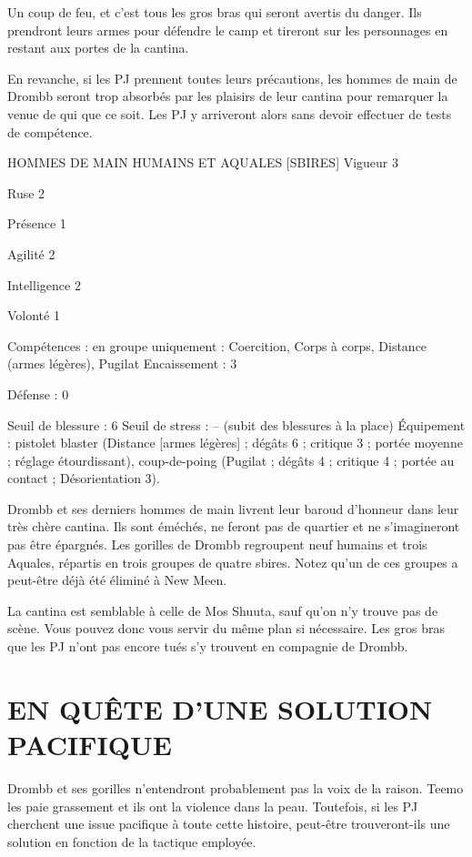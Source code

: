 \documentclass[a4paper,10pt,twoside,twocolumn,openany]{book}
\begin{document}
Un coup de feu, et c’est tous les gros bras qui seront avertis du danger. Ils prendront leurs armes pour défendre le camp et tireront sur les personnages en restant aux portes de la cantina.

En revanche, si les PJ prennent toutes leurs précautions, les hommes de main de Drombb seront trop absorbés par les plaisirs de leur cantina pour remarquer la venue de qui que ce soit. Les PJ y arriveront alors sans
devoir effectuer de tests de compétence.

\begin{monsterbox}
  
HOMMES DE MAIN HUMAINS
ET AQUALES [SBIRES]
Vigueur 3

Ruse 2

Présence 1

Agilité 2

Intelligence 2

Volonté 1

Compétences : en groupe uniquement : Coercition,
Corps à corps, Distance (armes légères), Pugilat
Encaissement : 3

Défense : 0

Seuil de blessure : 6
Seuil de stress : – (subit des blessures à la place)
Équipement : pistolet blaster (Distance [armes légères] ; dégâts 6 ; critique 3 ; portée moyenne ;
réglage étourdissant), coup-de-poing (Pugilat ; dégâts 4 ; critique 4 ; portée au contact ; Désorientation 3).
\end{monsterbox}


\subtitle{COMBAT À LA CANTINA}

Drombb et ses derniers hommes de main livrent leur baroud d’honneur dans leur très chère cantina. Ils sont éméchés, ne feront pas de quartier et ne s’imagineront pas être épargnés. Les gorilles de Drombb regroupent neuf humains et trois Aquales, répartis en trois groupes de quatre sbires. Notez qu’un de ces groupes a peut-être déjà été éliminé à New Meen.

La cantina est semblable à celle de Mos Shuuta, sauf
qu’on n’y trouve pas de scène. Vous pouvez donc vous
servir du même plan si nécessaire. Les gros bras que les
PJ n’ont pas encore tués s’y trouvent en compagnie de
Drombb.

\section{EN QUÊTE D’UNE SOLUTION PACIFIQUE}

Drombb et ses gorilles n’entendront probablement pas la
voix de la raison. Teemo les paie grassement et ils ont la
violence dans la peau. Toutefois, si les PJ cherchent une
issue pacifique à toute cette histoire, peut-être trouveront-ils une solution en fonction de la tactique employée.
\end{document}
